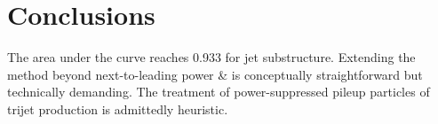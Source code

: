 \section{Conclusions}\label{sec:conclusions}

The area under the curve reaches 0.933 for jet substructure. Extending
the method beyond next-to-leading power & is conceptually straightforward
but technically demanding. The treatment of power-suppressed pileup
particles of trijet production is admittedly heuristic.

